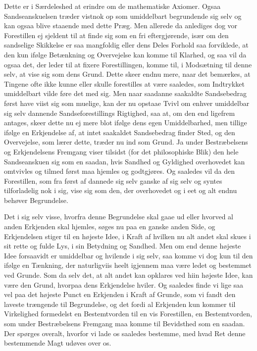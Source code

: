 \documentclass[12pt,a4paper]{book}
\newcommand{\apage}[1]{\marginnote{\footnotesize\textit{[#1]}}}
\begin{document}
Dette er i Særdeleshed at erindre om de mathematiske Axiomer. Ogsaa
Sandseanskuelsen træder vistnok op som umiddelbart begrundende sig selv og kan
ogsaa blive staaende med dette Præg. Men allerede da anlediges dog vor
Forestillen ej sjeldent til at finde sig som en fri eftergjørende, især om den
sandselige Skikkelse er saa mangfoldig eller dens Deles Forhold saa forviklede,
at den kun ifølge Betænkning og Overvejelse kan komme til Klarhed, og saa vil da
ogsaa det, der leder til at fixere Forestillingen, komme til, i Modsætning til
denne selv, at vise sig som dens Grund. Dette skeer endnu mere, naar det
bemærkes, at  \apage{39} Tingene ofte ikke kunne eller skulle forestilles at være saaledes,
som Indtrykket umiddelbart vilde føre det med sig. Men naar saadanne saakaldte
Sandsebedrag først have viist sig som muelige, kan der nu opstaae Tvivl om
enhver umiddelbar sig selv dannende Sandseforestillings Rigtighed, saa at, om
den end ligefrem antages, skeer dette nu ej mere blot ifølge dens egen
Umiddelbarhed, men tillige ifølge en Erkjendelse af, at intet saakaldet
Sandsebedrag finder Sted, og den Overvejelse, som lærer dette, træder nu ind som
Grund. Ja under Bestræbelsens og Erkjendelsens Fremgang viser tilsidst (for det
philosophiske Blik) den hele Sandseanskuen sig som en saadan, hvis Sandhed og
Gyldighed overhovedet kan omtvivles og tilmed først maa hjemles og godtgjøres.
Og saaledes vil da den Forestillen, som fra først af dannede sig selv ganske af
sig selv og syntes tilforladelig nok i sig, vise sig som den, der overhovedet og
i eet og alt endnu behøver Begrundelse.

Det i sig selv visse, hvorfra denne Begrundelse skal gaae ud eller hvorved al
anden Erkjenden skal hjemles, søges nu paa en ganske anden Side, og Erkjendelsen
stiger til en højeste Idee, i Kraft af hvilken nu alt andet skal skues i sit
rette og fulde Lys, i sin Betydning og Sandhed. Men om end denne højeste Idee
forsaavidt er umiddelbar og hvilende i sig selv, saa komme vi dog kun til den
ifølge en Tænkning, der naturligviis heelt igjennem maa være ledet og  \apage{40} bestemmet
ved Grunde. Som da selv det, at alt andet kan opklares ved hiin højeste Idee,
kan være den Grund, hvorpaa dens Erkjendelse hviler. Og saaledes finde vi lige
saa vel paa det højeste Punct en Erkjenden i Kraft af Grunde, som vi fandt den
laveste trængende til Begrundelse, og det fordi al Erkjenden kun kommer til
Virkelighed formedelst en Bestemtvorden til en vis Forestillen, en
Bestemtvorden, som under Bestræbelsens Fremgang maa komme til Bevidsthed som en
saadan. Der spørges overalt, hvorfor vi lade os saaledes bestemme, med hvad Ret
denne bestemmende Magt udøves over os.
\end{document}
